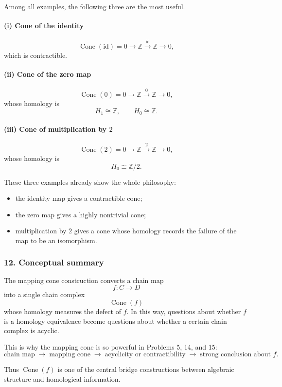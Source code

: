 \documentclass[12pt,a4paper]{article}
\theoremstyle{notespace}
\begin{document}
Among all examples, the following three are the most useful.

\paragraph{(i) Cone of the identity}
\[
\operatorname{Cone}(\mathrm{id})=
0\to \mathbb Z \xrightarrow{\mathrm{id}} \mathbb Z \to 0,
\]
which is contractible.

\paragraph{(ii) Cone of the zero map}
\[
\operatorname{Cone}(0)=
0\to \mathbb Z \xrightarrow{0} \mathbb Z \to 0,
\]
whose homology is
\[
H_1\cong \mathbb Z,\qquad H_0\cong \mathbb Z.
\]

\paragraph{(iii) Cone of multiplication by \(2\)}
\[
\operatorname{Cone}(2)=
0\to \mathbb Z \xrightarrow{2} \mathbb Z \to 0,
\]
whose homology is
\[
H_0\cong \mathbb Z/2.
\]

These three examples already show the whole philosophy:
\begin{itemize}
	\item the identity map gives a contractible cone;
	\item the zero map gives a highly nontrivial cone;
	\item multiplication by \(2\) gives a cone whose homology records the failure of the map to be an isomorphism.
\end{itemize}

\subsubsection*{12. Conceptual summary}

The mapping cone construction converts a chain map
\[
f:C\to D
\]
into a single chain complex
\[
\operatorname{Cone}(f)
\]
whose homology measures the defect of \(f\). In this way, questions about whether \(f\) is a homology equivalence become questions about whether a certain chain complex is acyclic.

This is why the mapping cone is so powerful in Problems 5, 14, and 15:
\[
\text{chain map}
\;\longrightarrow\;
\text{mapping cone}
\;\longrightarrow\;
\text{acyclicity or contractibility}
\;\longrightarrow\;
\text{strong conclusion about }f.
\]

Thus \(\operatorname{Cone}(f)\) is one of the central bridge constructions between algebraic structure and homological information.
\end{document}
